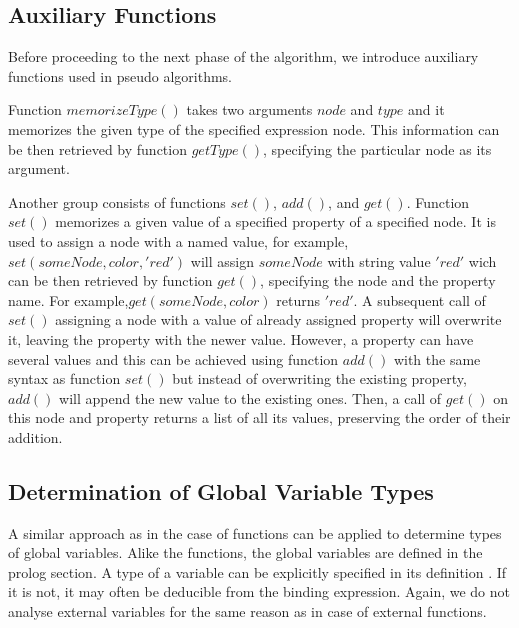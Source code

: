 \subsection{Auxiliary Functions}
Before proceeding to the next phase of the algorithm, we introduce auxiliary functions used in pseudo algorithms.

Function $memorizeType()$ takes two arguments $node$ and $type$ and it memorizes the given type of the specified expression node. This information can be then retrieved by function $getType()$, specifying the particular node as its argument.

Another group consists of functions $set()$, $add()$, and $get()$. Function $set()$ memorizes a given value of a specified property of a specified node. It is used to assign a node with a named value, for example, $set(someNode, color, 'red')$ will assign $someNode$ with string value $'red'$ wich can be then retrieved by function $get()$, specifying the node and the property name. For example,\linebreak $get(someNode, color)$ returns $'red'$. A subsequent call of $set()$ assigning a node with a value of already assigned property will overwrite it, leaving the property with the newer value. However, a property can have several values and this can be achieved using function $add()$ with the same syntax as function $set()$ but instead of overwriting the existing property, $add()$ will append the new value to the existing ones. Then, a call of $get()$ on this node and property returns a list of all its values, preserving the order of their addition.

\subsection{Determination of Global Variable Types}
A similar approach as in the case of functions can be applied to determine types of global variables. Alike the functions, the global variables are defined in the prolog section. A type of a variable can be explicitly specified in its definition . If it is not, it may often be deducible from the binding expression. Again, we do not analyse external variables for the same reason as in case of external functions.

